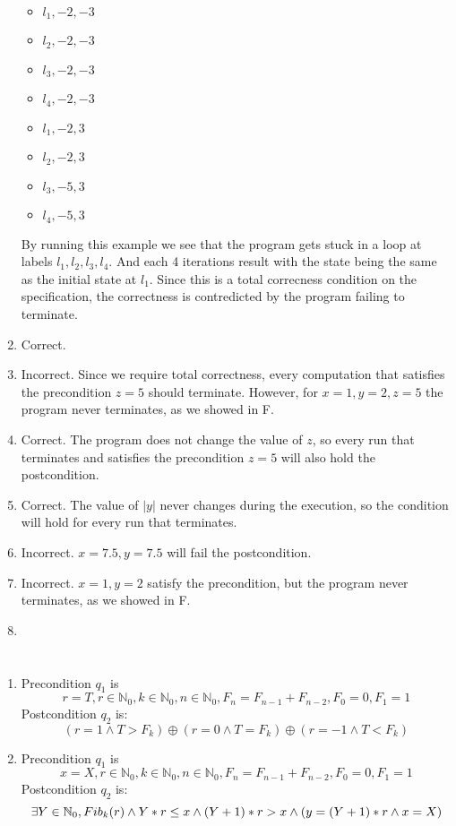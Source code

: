 \documentclass{article}
\begin{document}
\begin{enumerate}[label=\Alph*.]
\begin{itemize}
        \item $l_1, -2, -3$
        \item $l_2, -2, -3$
        \item $l_3, -2, -3$
        \item $l_4, -2, -3$
        \item $l_1, -2, 3$
        \item $l_2, -2, 3$
        \item $l_3, -5, 3$
        \item $l_4, -5, 3$
    \end{itemize}
    By running this example we see that the program gets stuck in a loop
    at labels $l_1, l_2, l_3, l_4$. And each 4 iterations result with the state
    being the same as the initial state at $l_1$.
    Since this is a total correcness condition on the specification,
    the correctness is contredicted by the program failing to terminate.
    \item Correct.
    \item Incorrect. Since we require total correctness, every computation that satisfies the precondition $z=5$ should terminate. However, for $x=1, y=2, z=5$ the program never terminates, as we showed in F.
    \item Correct. The program does not change the value of $z$, so every run that terminates and satisfies the precondition $z=5$ will also hold the postcondition.
    \item Correct. The value of $|y|$ never changes during the execution, so the condition will hold for every run that terminates.
    \item Incorrect. $x=7.5, y=7.5$ will fail the postcondition.
    \item Incorrect. $x=1, y=2$ satisfy the precondition, but the program never terminates, as we showed in F.
    \item
\end{enumerate}

\section{}
\begin{enumerate}[label=\Alph*.]
    \item Precondition $q_1$ is $$r=T, r \in \mathbb{N}_0, k \in \mathbb{N}_0, n \in \mathbb{N}_0, F_n = F_{n-1}+F_{n-2}, F_0 = 0, F_1 = 1$$
    Postcondition $q_2$ is: $$(r=1 \wedge T>F_k) \oplus (r=0 \wedge T=F_k) \oplus (r=-1 \wedge T<F_k)$$
    
    \item Precondition $q_1$ is $$x=X, r \in \mathbb{N}_0, k \in \mathbb{N}_0, n \in \mathbb{N}_0, F_n = F_{n-1}+F_{n-2}, F_0 = 0, F_1 = 1$$
    Postcondition $q_2$ is:
    $$ \exists Y \in \mathbb{N}_0, Fib_k(r) \wedge \\
    Y*r\leq x \wedge (Y+1)*r > x \wedge \\
    (y=(Y+1)*r \wedge x=X)$$
\end{enumerate}
\end{document}
